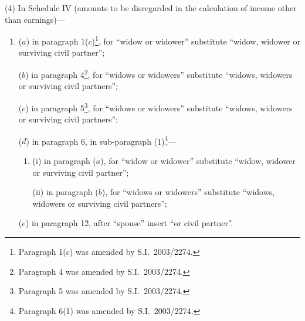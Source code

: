 \documentclass[12pt,a4paper]{article}
\begin{document}
(4) In Schedule IV (amounts to be disregarded in the calculation of income other than earnings)—
\begin{enumerate}\item[]
($a$) in paragraph 1($c$)\footnote{Paragraph 1($c$) was amended by S.I.\ 2003/2274.}, for “widow or widower” substitute “widow, widower or surviving civil partner”;

($b$) in paragraph 4\footnote{Paragraph 4 was amended by S.I.\ 2003/2274.}, for “widows or widowers” substitute “widows, widowers or surviving civil partners”;

($c$) in paragraph 5\footnote{Paragraph 5 was amended by S.I.\ 2003/2274.}, for “widows or widowers” substitute “widows, widowers or surviving civil partners”;

($d$) in paragraph 6, in sub-paragraph (1)\footnote{Paragraph 6(1) was amended by S.I.\ 2003/2274.}—
\begin{enumerate}\item[]
(i) in paragraph ($a$), for “widow or widower” substitute “widow, widower or surviving civil partner”;

(ii) in paragraph ($b$), for “widows or widowers” substitute “widows, widowers or surviving civil partners”;
\end{enumerate}

($e$) in paragraph 12, after “spouse” insert “or civil partner”.
\end{enumerate}
\end{document}

